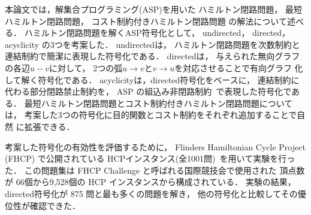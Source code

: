 本論文では，解集合プログラミング(ASP)を用いた
ハミルトン閉路問題，
最短ハミルトン閉路問題，
コスト制約付きハミルトン閉路問題
の解法について述べる．
%
ハミルトン閉路問題を解くASP符号化として，
\textsf{undirected}，
\textsf{directed}，
\textsf{acyclicity}
の3つを考案した．
\textsf{undirected}は，
ハミルトン閉路問題を次数制約と連結制約で簡潔に表現した符号化である．
\textsf{directed}は，
与えられた無向グラフの各辺$u-v$に対して，
2つの弧$u\rightarrow v$と$v\rightarrow u$を対応させることで有向グラフ
化して解く符号化である．
\textsf{acyclicity}は，\textsf{directed}符号化をベースに，
連結制約に代わる部分閉路禁止制約を，
ASP の組込み非閉路制約~\cite{bomanson16:acyclicity}で表現した符号化である．
最短ハミルトン閉路問題とコスト制約付きハミルトン閉路問題については，
考案した3つの符号化に目的関数とコスト制約をそれぞれ追加することで自然
に拡張できる．

考案した符号化の有効性を評価するために，
Flinders Hamiltonian Cycle Project (FHCP) で公開されている
HCPインスタンス(全1001問)~\cite{haythorpe19:fhcp}を用いて実験を行った．
この問題集は FHCP Challenge と呼ばれる国際競技会で使用された
頂点数が 66個から9,528個の HCP インスタンスから構成されている．
実験の結果，
\textsf{directed}符号化が 875 問と最も多くの問題を解き，
他の符号化と比較してその優位性が確認できた．



